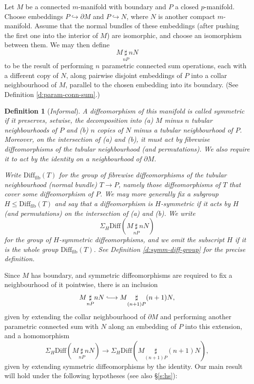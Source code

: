 \documentclass[reqno,a4paper]{article}
\numberwithin{equation}{section}
\theoremstyle{italicised}
\theoremstyle{upright}
\newtheorem{defn}[thm]{Definition}
\theoremstyle{italicised-restate}
\newcommand{\lhto}{\lhook\joinrel\longrightarrow}
\renewcommand{\leq}{\leqslant}
\begin{document}
Let $M$ be a connected $m$-manifold with boundary and $P$ a closed $p$-manifold. Choose embeddings $P \hookrightarrow \partial M$ and $P \hookrightarrow N$, where $N$ is another compact $m$-manifold. Assume that the normal bundles of these embeddings (after pushing the first one into the interior of $M$) are isomorphic, and choose an isomorphism between them. We may then define
\[
M \underset{nP}{\sharp} nN
\]
to be the result of performing $n$ parametric connected sum operations, each with a different copy of $N$, along pairwise disjoint embeddings of $P$ into a collar neighbourhood of $M$, parallel to the chosen embedding into its boundary. (See Definition \ref{d:param-conn-sum}.)

\begin{defn}[{\itshape Informal}]
A diffeomorphism of this manifold is called \emph{symmetric} if it preserves, setwise, the decomposition into (a) $M$ minus $n$ tubular neighbourhoods of $P$ and (b) $n$ copies of $N$ minus a tubular neighbourhood of $P$. Moreover, on the intersection of (a) and (b), it must act by fibrewise diffeomorphisms of the tubular neighbourhood (and permutations). We also require it to act by the identity on a neighbourhood of $\partial M$.

Write $\mathrm{Diff}_{\mathrm{fib}}(T)$ for the group of fibrewise diffeomorphisms of the tubular neighbourhood (normal bundle) $T \to P$, namely those diffeomorphisms of $T$ that cover some diffeomorphism of $P$. We may more generally fix a subgroup $H \leq \mathrm{Diff}_{\mathrm{fib}}(T)$ and say that a diffeomorphism is \emph{$H$-symmetric} if it acts by $H$ (and permutations) on the intersection of (a) and (b). We write
\[
\Sigma_H \mathrm{Diff}(M \underset{nP}{\sharp} nN)
\]
for the group of $H$-symmetric diffeomorphisms, and we omit the subscript $H$ if it is the whole group $\mathrm{Diff}_{\mathrm{fib}}(T)$. See Definition \ref{d:symm-diff-group} for the precise definition.
\end{defn}

Since $M$ has boundary, and symmetric diffeomorphisms are required to fix a neighbourhood of it pointwise, there is an inclusion
\[
M \underset{nP}{\sharp} nN \lhto M \underset{(n+1)P}{\sharp} (n+1)N,
\]
given by extending the collar neighbourhood of $\partial M$ and performing another parametric connected sum with $N$ along an embedding of $P$ into this extension, and a homomorphism
\begin{equation}\label{eq:stab-hom}
\Sigma_H \mathrm{Diff}(M \underset{nP}{\sharp} nN) \longrightarrow \Sigma_H \mathrm{Diff}(M \underset{(n+1)P}{\sharp} (n+1)N),
\end{equation}
given by extending symmetric diffeomorphisms by the identity. Our main result will hold under the following hypotheses (see also \S\ref{s:hs}):
\end{document}

